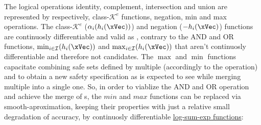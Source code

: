The logical operations identity, complement, intersection and union are represented by respectively, class-\(\mathcal{K}^e\) functions, negation, min and max operations. The class-\(\mathcal{K}^e\) (\(\alpha_i(h_i(\xVec))\)) and negation (\(-h_i(\xVec)\)) functions are continuosly differentiable and valid as , contrary to the AND and OR functions, \(\min_{ i \in \mathcal{I}} (h_i(\xVec))\) and \(\max_{ i \in \mathcal{I}} (h_i(\xVec))\) that aren't continuosly differentiable and therefore not  candidates.  The \(\max\) and \(\min\) functions capacitate combining safe sets defined by multiple  (accordingly to the operation) and to obtain a new safety specification as is expected to see while merging multiple  into a single one. So, in order to viablize the AND and OR operation and achieve the merge of s, the \(min\) and \(max\) functions can be replaced via smooth-aproximation, keeping their properties with just a relative small degradation of accuracy, by continuosly differentiable \underline{log-sum-exp functions}:


